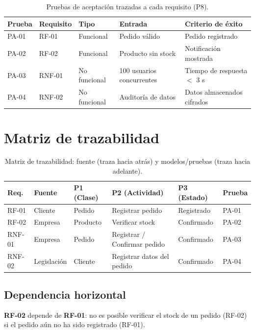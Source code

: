 \documentclass[11pt,a4paper]{article}
\begin{document}
\begin{table}[h!]
\centering\small
\begin{tabular}{lllll}
\toprule
\textbf{Prueba} & \textbf{Requisito} & \textbf{Tipo} & \textbf{Entrada} & \textbf{Criterio de éxito} \\
\midrule
PA-01 & RF-01  & Funcional     & Pedido válido        & Pedido registrado \\
PA-02 & RF-02  & Funcional     & Producto sin stock    & Notificación mostrada \\
PA-03 & RNF-01 & No funcional  & 100 usuarios concurrentes & Tiempo de respuesta $<$ 3 s \\
PA-04 & RNF-02 & No funcional  & Auditoría de datos    & Datos almacenados cifrados \\
\bottomrule
\end{tabular}
\caption{Pruebas de aceptación trazadas a cada requisito (P8).}
\end{table}

\newpage
\section{Matriz de trazabilidad}
\label{sec:p9}

\begin{table}[h!]
\centering\small
\begin{tabular}{lllll l}
\toprule
\textbf{Req.} & \textbf{Fuente} & \textbf{P1 (Clase)} & \textbf{P2 (Actividad)} & \textbf{P3 (Estado)} & \textbf{Prueba} \\
\midrule
RF-01  & Cliente     & Pedido   & Registrar pedido      & Registrado & PA-01 \\
RF-02  & Empresa     & Producto & Verificar stock        & Confirmado & PA-02 \\
RNF-01 & Empresa     & Pedido   & Registrar / Confirmar pedido & Confirmado & PA-03 \\
RNF-02 & Legislación & Cliente  & Registrar datos del pedido & Confirmado & PA-04 \\
\bottomrule
\end{tabular}
\caption{Matriz de trazabilidad: fuente (traza hacia atrás) y modelos/pruebas (traza hacia adelante).}
\end{table}

\subsection*{Dependencia horizontal}
\textbf{RF-02} depende de \textbf{RF-01}: no es posible verificar el stock de un
pedido (RF-02) si el pedido aún no ha sido registrado (RF-01).
\end{document}
